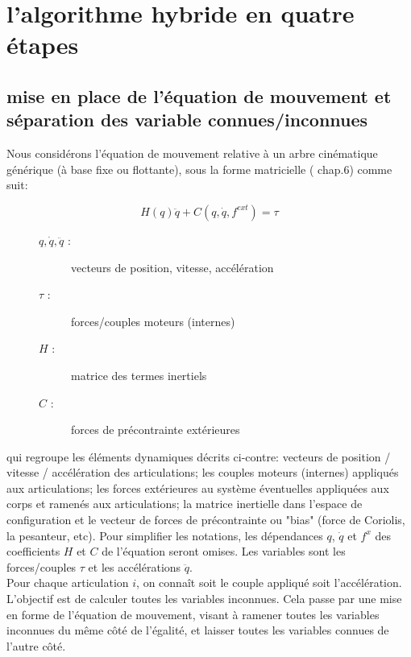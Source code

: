 \documentclass{report}
\begin{document}
\section{l'algorithme hybride en quatre étapes}

\subsection{mise en place de l'équation de mouvement et séparation des variable connues/inconnues}

Nous considérons l'équation de mouvement relative à un arbre cinématique générique (à base fixe ou flottante), sous la forme matricielle (\cite{bib_featherstone} chap.6) comme suit:

\begin{equation} \label{equ_equationMvt}
H(q)\ddot{q} + C(q,\dot{q},f^{ext}) = \tau
\end{equation}

\medskip

\begin{figure}
  \begin{flushright}
  \begin{minipage}[t]{0.45\textwidth}
  \begin{description}
    \item[$q, \dot{q}, \ddot{q}$ :] vecteurs de position, vitesse, accélération
    \item[$\tau$ :] forces/couples moteurs (internes)
    \item[$H$ :] matrice des termes inertiels
    \item[$C$ :] forces de précontrainte extérieures
  \end{description}
  \end{minipage}
  \end{flushright}
\end{figure}

qui regroupe les éléments dynamiques décrits ci-contre: vecteurs de position / vitesse / accélération des articulations; les couples moteurs (internes) appliqués aux articulations; les forces extérieures au système éventuelles appliquées aux corps et ramenés aux articulations; la matrice inertielle dans l'espace de configuration et le vecteur de forces de précontrainte ou "bias" (force de Coriolis, la pesanteur, etc).
Pour simplifier les notations, les dépendances $q$, $\dot{q}$ et $f^x$ des coefficients $H$ et $C$ de l'équation seront omises. Les variables sont les forces/couples $\tau$ et les accélérations $\ddot{q}$.\\
Pour chaque articulation $i$, on connaît soit le couple appliqué soit l'accélération. L'objectif est de calculer toutes les variables inconnues. Cela passe par une mise en forme de l'équation de mouvement, visant à ramener toutes les variables inconnues du même côté de l'égalité, et laisser toutes les variables connues de l'autre côté.
\end{document}
